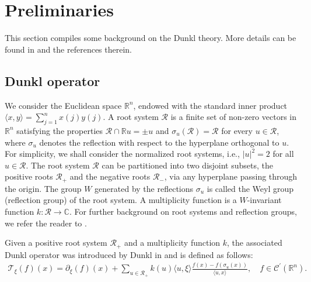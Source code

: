 \documentclass[11pt,a4paper,reqno]{amsproc}
\theoremstyle{definition}
\theoremstyle{remark}
\numberwithin{equation}{section}
\begin{document}
\section{Preliminaries} \label{S:2}
This section compiles some background on the Dunkl theory. More details can be found in \cite{DJ1, D1, D2, D3, Rosler-2003} and the references therein. 

\subsection{Dunkl operator}  
We consider the Euclidean space $\mathbb{R}^n$, endowed with the standard inner product $\langle x, y \rangle = \sum_{j=1}^n x(j)y(j)$. A root system $\mathcal{R}$ is a finite set of non-zero vectors in $\mathbb{R}^n$ satisfying the properties $ \mathcal{R} \cap \mathbb{R}u = {\pm u} $ and $ \sigma_u(\mathcal{R}) = \mathcal{R} $ for every $u \in \mathcal{R}$, where $\sigma_u$ denotes the reflection with respect to the hyperplane orthogonal to $u$. For simplicity, we shall consider the normalized root systems, i.e., $|u|^2 = 2$ for all $u \in \mathcal{R}$. The root system $\mathcal{R}$ can be partitioned into two disjoint subsets, the positive roots $\mathcal{R}_+$ and the negative roots $\mathcal{R}_{-}$, via any hyperplane passing through the origin.
The group $W$ generated by the reflections $\sigma_u$ is called the Weyl group (reflection group) of the root system.
A multiplicity function is a $W$-invariant function $k: \mathcal{R} \to \mathbb{C}$.
For further background on root systems and reflection groups, we refer the reader to \cite{GB, Hu, RKAN}.
 
 Given a positive root system $\mathcal{R}_+ $ and a multiplicity function $k$, the associated Dunkl operator was introduced by Dunkl in \cite{D1} and is defined as follows:
\begin{eqnarray*} 
    \mathcal{T}_{\xi}(f)(x) = \partial_{\xi}(f)(x)+ \sum_{u\in \mathcal{R}_+}k(u) \langle u, \xi \rangle \frac{f(x)-f(\sigma_u(x))}{\langle u, x\rangle}, \quad f\in \mathcal{C}^{\prime}(\mathbb{R}^n).
\end{eqnarray*} 
\end{document}

